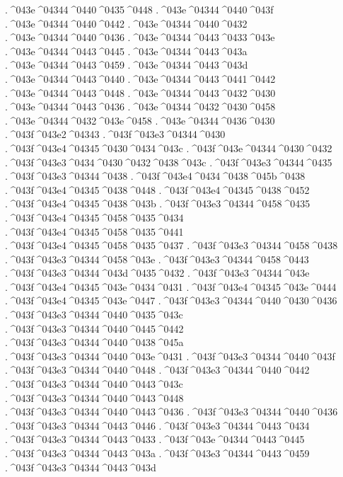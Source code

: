 {.^^^^043e^^^^04344^^^^0440^^^^0435^^^^0448
.^^^^043e^^^^04344^^^^0440^^^^043f
.^^^^043e^^^^04344^^^^0440^^^^0442
.^^^^043e^^^^04344^^^^0440^^^^0432
.^^^^043e^^^^04344^^^^0440^^^^0436
.^^^^043e^^^^04344^^^^0443^^^^0433^^^^043e
.^^^^043e^^^^04344^^^^0443^^^^0445
.^^^^043e^^^^04344^^^^0443^^^^043a
.^^^^043e^^^^04344^^^^0443^^^^0459
.^^^^043e^^^^04344^^^^0443^^^^043d
.^^^^043e^^^^04344^^^^0443^^^^0440
.^^^^043e^^^^04344^^^^0443^^^^0441^^^^0442
.^^^^043e^^^^04344^^^^0443^^^^0448
.^^^^043e^^^^04344^^^^0443^^^^0432^^^^0430
.^^^^043e^^^^04344^^^^0443^^^^0436
.^^^^043e^^^^04344^^^^0432^^^^0430^^^^0458
.^^^^043e^^^^04344^^^^0432^^^^043e^^^^0458
.^^^^043e^^^^04344^^^^0436^^^^0430
.^^^^043f^^^^043e2^^^^04343
.^^^^043f^^^^043e3^^^^04344^^^^0430
.^^^^043f^^^^043e4^^^^04345^^^^0430^^^^0434^^^^043c
.^^^^043f^^^^043e^^^^04344^^^^0430^^^^0432
.^^^^043f^^^^043e3^^^^0434^^^^0430^^^^0432^^^^0438^^^^043c
.^^^^043f^^^^043e3^^^^04344^^^^0435
.^^^^043f^^^^043e3^^^^04344^^^^0438
.^^^^043f^^^^043e4^^^^0434^^^^0438^^^^045b^^^^0438
.^^^^043f^^^^043e4^^^^04345^^^^0438^^^^0448
.^^^^043f^^^^043e4^^^^04345^^^^0438^^^^0452
.^^^^043f^^^^043e4^^^^04345^^^^0438^^^^043b
.^^^^043f^^^^043e3^^^^04344^^^^0458^^^^0435
.^^^^043f^^^^043e4^^^^04345^^^^0458^^^^0435^^^^0434
.^^^^043f^^^^043e4^^^^04345^^^^0458^^^^0435^^^^0441
.^^^^043f^^^^043e4^^^^04345^^^^0458^^^^0435^^^^0437
.^^^^043f^^^^043e3^^^^04344^^^^0458^^^^0438
.^^^^043f^^^^043e3^^^^04344^^^^0458^^^^043e
.^^^^043f^^^^043e3^^^^04344^^^^0458^^^^0443
.^^^^043f^^^^043e3^^^^04344^^^^043d^^^^0435^^^^0432
.^^^^043f^^^^043e3^^^^04344^^^^043e
.^^^^043f^^^^043e4^^^^04345^^^^043e^^^^0434^^^^0431
.^^^^043f^^^^043e4^^^^04345^^^^043e^^^^0444
.^^^^043f^^^^043e4^^^^04345^^^^043e^^^^0447
.^^^^043f^^^^043e3^^^^04344^^^^0440^^^^0430^^^^0436
.^^^^043f^^^^043e3^^^^04344^^^^0440^^^^0435^^^^043c
.^^^^043f^^^^043e3^^^^04344^^^^0440^^^^0445^^^^0442
.^^^^043f^^^^043e3^^^^04344^^^^0440^^^^0438^^^^045a
.^^^^043f^^^^043e3^^^^04344^^^^0440^^^^043e^^^^0431
.^^^^043f^^^^043e3^^^^04344^^^^0440^^^^043f
.^^^^043f^^^^043e3^^^^04344^^^^0440^^^^0448
.^^^^043f^^^^043e3^^^^04344^^^^0440^^^^0442
.^^^^043f^^^^043e3^^^^04344^^^^0440^^^^0443^^^^043c
.^^^^043f^^^^043e3^^^^04344^^^^0440^^^^0443^^^^0448
.^^^^043f^^^^043e3^^^^04344^^^^0440^^^^0443^^^^0436
.^^^^043f^^^^043e3^^^^04344^^^^0440^^^^0436
.^^^^043f^^^^043e3^^^^04344^^^^0443^^^^0446
.^^^^043f^^^^043e3^^^^04344^^^^0443^^^^0434
.^^^^043f^^^^043e3^^^^04344^^^^0443^^^^0433
.^^^^043f^^^^043e^^^^04344^^^^0443^^^^0445
.^^^^043f^^^^043e3^^^^04344^^^^0443^^^^043a
.^^^^043f^^^^043e3^^^^04344^^^^0443^^^^0459
.^^^^043f^^^^043e3^^^^04344^^^^0443^^^^043d
}
